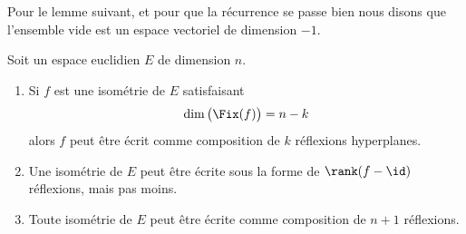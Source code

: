 Pour le lemme suivant, et pour que la récurrence se passe bien nous disons que l'ensemble vide est un espace vectoriel de dimension \( -1\).
\begin{lemma}       \label{LEMooJCDRooGAmlwp}
	Soit un espace euclidien \( E\) de dimension \( n\).
	\begin{enumerate}
		\item       \label{ITEMooFYEDooIJZBjP}
		      Si \( f\) est une isométrie de \( E\) satisfaisant
		      \begin{equation}
			      \dim\big( \Fix(f) \big)=n-k
		      \end{equation}
		      alors \( f\) peut être écrit comme composition de \( k\) réflexions hyperplanes.
		\item       \label{ITEMooJTZVooWvyfDD}
		      Une isométrie de \( E\) peut être écrite sous la forme de \( \rank(f-\id)\) réflexions, mais pas moins.
		\item       \label{ITEMooUCZWooSbyPwt}
		      Toute isométrie de \( E\) peut être écrite comme composition de \( n+1\) réflexions.
	\end{enumerate}
\end{lemma}


